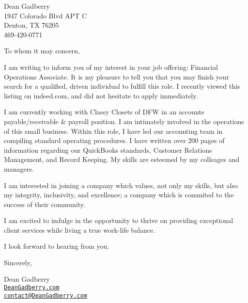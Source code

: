 \documentclass[12pt,a4paper,english]{article}
\begin{document}
\begin{flushleft}

Dean Gadberry\\
1947 Colorado Blvd APT C\\
Denton, TX 76205\\
469-420-0771

\par

To whom it may concern,

I am writing to inform you of my interest in your job offering: Financial Operations Associate. It is my pleasure to tell you that you may finish your search for a qualified, driven individual to fulfill this role. I recently viewed this listing on indeed.com, and did not hesitate to apply immediately.

I am currently working with Classy Closets of DFW in an accounts payable/receivable \& payroll position. I am intimately involved in the operations of this small business. Within this role, I have led our accounting team in compiling standard operating procedures. I have written over 200 pages of information regarding our QuickBooks standards, Customer Relations Management, and Record Keeping. My skills are esteemed by my colleages and managers. 

I am interested in joining a company which values, not only my skills, but also my integrity, inclusivity, and excellence; a company which is commited to the success of their community. 

I am excited to indulge in the opportunity to thrive on providing exceptional client services while living a true work-life balance.

I look forward to hearing from you.

\hfill\break
\hfill\break
\hfill\break
Sincerely,

Dean Gadberry \\
\href{https://www.deangadberry.com}{\texttt{DeanGadberry.com}}\\
\href{mailto:contact@deangadberry.com}{\texttt{contact@DeanGadberry.com}}\\

\end{flushleft}
\end{document}
